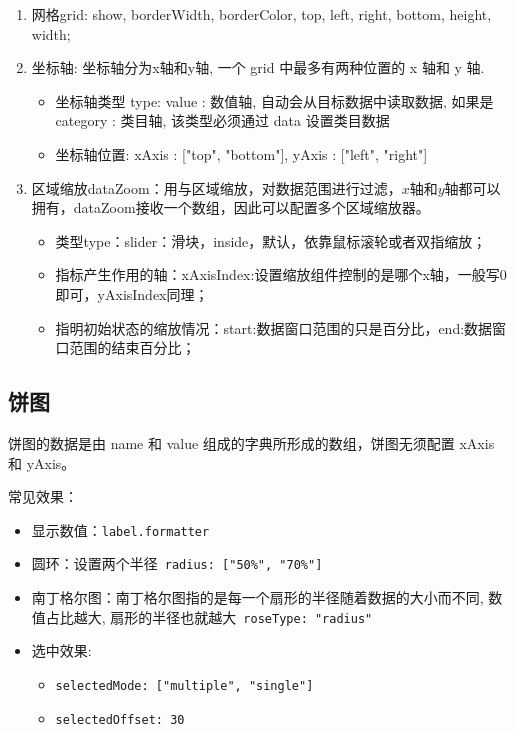 \begin{enumerate}
    \item 网格grid: show, borderWidth, borderColor, top, left, right, bottom, height, width;
    \item 坐标轴: 坐标轴分为x轴和y轴, 一个 grid 中最多有两种位置的 x 轴和 y 轴.
    \begin{itemize}
        \item 坐标轴类型 type: value : 数值轴, 自动会从目标数据中读取数据, 如果是category : 类目轴, 该类型必须通过 data 设置类目数据
        \item 坐标轴位置: xAxis :  ["top", "bottom"], yAxis : ["left", "right"]
    \end{itemize}
    \item 区域缩放dataZoom：用与区域缩放，对数据范围进行过滤，$x$轴和$y$轴都可以拥有，dataZoom接收一个数组，因此可以配置多个区域缩放器。
    \begin{itemize}
        \item 类型type：slider：滑块，inside，默认，依靠鼠标滚轮或者双指缩放；
        \item 指标产生作用的轴：xAxisIndex:设置缩放组件控制的是哪个x轴，一般写0即可，yAxisIndex同理；
        \item 指明初始状态的缩放情况：start:数据窗口范围的只是百分比，end:数据窗口范围的结束百分比；
    \end{itemize}
\end{enumerate}

\subsection{饼图}
饼图的数据是由 name 和 value 组成的字典所形成的数组，饼图无须配置 xAxis 和 yAxis。

常见效果：
\begin{itemize}
    \item 显示数值：\verb|label.formatter|
    \item 圆环：设置两个半径~\verb|radius: ["50%", "70%"]|
    \item 南丁格尔图：南丁格尔图指的是每一个扇形的半径随着数据的大小而不同, 数值占比越大, 扇形的半径也就越大~\verb|roseType: "radius"|
    \item 选中效果: 
    \begin{itemize}
        \item \verb|selectedMode: ["multiple", "single"]|
        \item \verb|selectedOffset: 30|
    \end{itemize}
\end{itemize}

